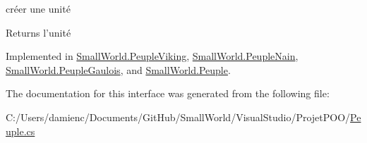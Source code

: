 créer une unité 

\begin{DoxyReturn}{Returns}
l'unité 
\end{DoxyReturn}


Implemented in \hyperlink{class_small_world_1_1_peuple_viking_a28216d67245dc1c8db45b4c9d763923f}{Small\-World.\-Peuple\-Viking}, \hyperlink{class_small_world_1_1_peuple_nain_a31cf5c32229c6f88acf69de84a8c6ebf}{Small\-World.\-Peuple\-Nain}, \hyperlink{class_small_world_1_1_peuple_gaulois_aac9e86d3354a8c4e588a942c705539ee}{Small\-World.\-Peuple\-Gaulois}, and \hyperlink{class_small_world_1_1_peuple_a9d7edd46744bf12c7592b93342835a9b}{Small\-World.\-Peuple}.



The documentation for this interface was generated from the following file\-:\begin{DoxyCompactItemize}
\item 
C\-:/\-Users/damienc/\-Documents/\-Git\-Hub/\-Small\-World/\-Visual\-Studio/\-Projet\-P\-O\-O/\hyperlink{_peuple_8cs}{Peuple.\-cs}\end{DoxyCompactItemize}
